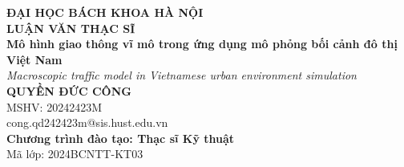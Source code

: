 \documentclass[main.tex]{subfiles}
\begin{document}
\begin{titlepage}
\thispagestyle{empty}
\begin{center}

{\textbf{\large{ĐẠI HỌC BÁCH KHOA HÀ NỘI}}}\\[4cm]

{\textbf{\huge{LUẬN VĂN THẠC SĨ}}}\\[1cm]
{\textbf{\Large{Mô hình giao thông vĩ mô trong ứng dụng mô phỏng bối cảnh đô thị Việt Nam}}}\\[0.4cm]
{\textit{\large{Macroscopic traffic model in Vietnamese urban environment simulation}}}\\[1cm]

{\textbf{\large{QUYỀN ĐỨC CÔNG}}}\\
{\large{MSHV: 20242423M}}\\
{\large{cong.qd242423m@sis.hust.edu.vn}}\\[0.5cm]

{\textbf{\large{Chương trình đào tạo: Thạc sĩ Kỹ thuật}}}\\
{\large{Mã lớp: 2024BCNTT-KT03}}\\

\vspace{4cm}
\begin{table}[H]
\centering
{}
\end{table}
\end{center}

\end{titlepage}
\end{document}
